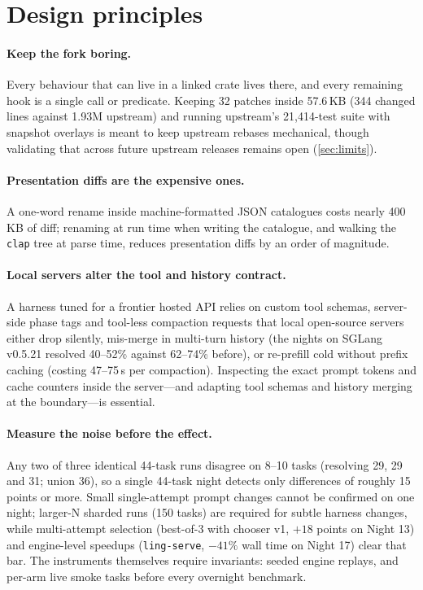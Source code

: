 \documentclass[11pt]{article}
\newcommand{\code}[1]{\texttt{#1}}
\begin{document}
\section{Design principles}
\label{sec:lessons}

\paragraph{Keep the fork boring.} Every behaviour that can live in a linked crate lives there, and
every remaining hook is a single call or predicate. Keeping 32 patches inside 57.6\,KB (344 changed lines
against 1.93M upstream) and running upstream's 21{,}414-test suite with snapshot overlays is meant to keep
upstream rebases mechanical, though validating that across future upstream releases remains open
(\cref{sec:limits}).

\paragraph{Presentation diffs are the expensive ones.} A one-word rename inside machine-formatted
JSON catalogues costs nearly 400\,KB of diff; renaming at run time when writing the catalogue, and
walking the \code{clap} tree at parse time, reduces presentation diffs by an order of magnitude.

\paragraph{Local servers alter the tool and history contract.} A harness tuned for a frontier
hosted API relies on custom tool schemas, server-side phase tags and tool-less compaction requests
that local open-source servers either drop silently, mis-merge in multi-turn history (the
nights on SGLang v0.5.21 resolved 40--52\% against 62--74\% before), or re-prefill cold without prefix caching (costing
47--75\,s per compaction). Inspecting the exact prompt tokens and cache counters inside the server—and
adapting tool schemas and history merging at the boundary—is essential.

\paragraph{Measure the noise before the effect.} Any two of three identical 44-task runs
disagree on 8--10 tasks (resolving 29, 29 and 31; union 36), so a single 44-task night detects only
differences of roughly 15 points or more. Small single-attempt prompt changes cannot
be confirmed on one night; larger-N sharded runs (150 tasks) are required for subtle harness
changes, while multi-attempt selection (best-of-3 with chooser v1, $+18$ points on Night 13) and
engine-level speedups (\code{ling-serve}, $-41\%$ wall time on Night 17) clear that bar. The instruments themselves require invariants: seeded engine replays, and per-arm live
smoke tasks before every overnight benchmark.
\end{document}
